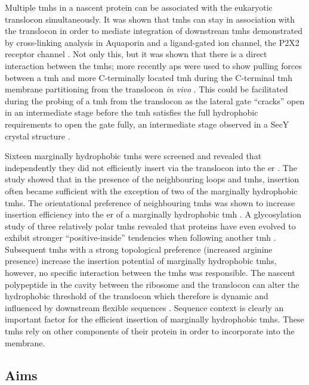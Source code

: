 Multiple \gls{tmh}s in a nascent protein can be associated with the eukaryotic translocon simultaneously.
It was shown that \gls{tmh}s can stay in association with the translocon in order to mediate integration of downstream \gls{tmh}s demonstrated by  cross\--linking analysis in Aquaporin \cite{Sadlish2005} and a ligand\--gated ion channel, the P2X2 receptor channel \cite{Cross2009}.
Not only this, but it was shown that there is a direct interaction between the \gls{tmh}s; more recently \gls{ap}s were used to show pulling forces between a \gls{tmh} and more C-terminally located \gls{tmh} during the C-terminal \gls{tmh} membrane partitioning from the translocon \textit{in vivo} \cite{Cymer2013}.
This could be facilitated during the probing of a \gls{tmh} from the translocon as the lateral gate ``cracks'' open in an intermediate stage before the \gls{tmh} satisfies the full hydrophobic requirements to open the gate fully, an intermediate stage observed in a SecY crystal structure \cite{Egea2010}.

Sixteen marginally hydrophobic \gls{tmh}s were screened and revealed that independently they did not efficiently insert via the translocon into the \gls{er} \cite{Hedin2010}.
The study showed that in the presence of the neighbouring loops and \gls{tmh}s, insertion often became sufficient with the exception of two of the marginally hydrophobic \gls{tmh}s.
The orientational preference of neighbouring \gls{tmh}s was shown to increase insertion efficiency into the \gls{er} of a marginally hydrophobic \gls{tmh} \cite{Ojemalm2012}.
A glycosylation study of three relatively polar \gls{tmh}s revealed that proteins have even evolved to exhibit stronger ``positive\--inside'' tendencies when following another \gls{tmh} \cite{Virkki2014}.
Subsequent \gls{tmh}s with a strong topological preference (increased arginine presence) increase the insertion potential of marginally hydrophobic \gls{tmh}s, however, no specific interaction between the \gls{tmh}s was responsible.
The nascent polypeptide in the cavity between the ribosome and the translocon can
alter the hydrophobic threshold of the translocon which therefore is dynamic and influenced by downstream flexible sequences \cite{Junne2017}.
Sequence context is clearly an important factor for the efficient insertion of marginally hydrophobic \gls{tmh}s.
These \gls{tmh}s rely on other components of their protein in order to incorporate into the membrane.

\subsection{Aims}

